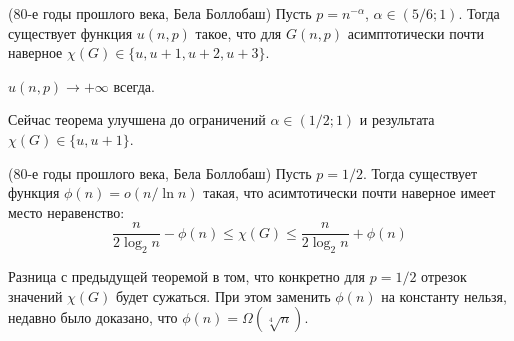 \begin{theorem} (80-е годы прошлого века, Бела Боллобаш)
	Пусть $p = n^{-\alpha}$, $\alpha \in (5 / 6; 1)$. Тогда существует функция $u(n, p)$ такое, что для $G(n, p)$ асимптотически почти наверное $\chi(G) \in \{u, u + 1, u + 2, u + 3\}$.
\end{theorem}

\begin{exercise}
	$u(n, p) \to +\infty$ всегда.
\end{exercise}

\begin{note}
	Сейчас теорема улучшена до ограничений $\alpha \in (1 / 2; 1)$ и результата $\chi(G) \in \{u, u + 1\}$.
\end{note}

\begin{theorem} (80-е годы прошлого века, Бела Боллобаш)
	Пусть $p = 1 / 2$. Тогда существует функция $\phi(n) = o(n / \ln n)$ такая, что асимтотически почти наверное имеет место неравенство:
	\[
		\frac{n}{2\log_2 n} - \phi(n) \le \chi(G) \le \frac{n}{2\log_2 n} + \phi(n)
	\]
\end{theorem}

\begin{note}
	Разница с предыдущей теоремой в том, что конкретно для $p = 1 / 2$ отрезок значений $\chi(G)$ будет сужаться. При этом заменить $\phi(n)$ на константу нельзя, недавно было доказано, что $\phi(n) = \Omega(\sqrt[4]{n})$.
\end{note}